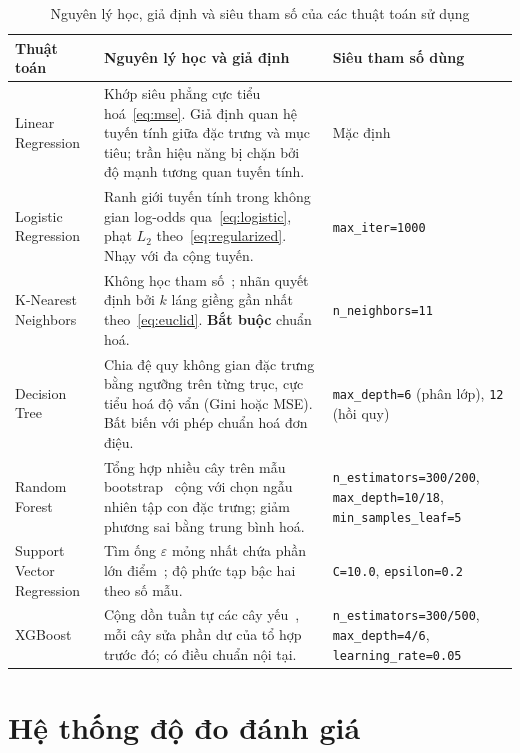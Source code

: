 \begin{table}[H]
\centering
\caption{Nguyên lý học, giả định và siêu tham số của các thuật toán sử dụng}
\label{tab:thuattoan}
\scriptsize
\begin{tabularx}{\textwidth}{@{}L{2.3cm}XL{2.95cm}@{}}
\toprule
\textbf{Thuật toán} & \textbf{Nguyên lý học và giả định} & \textbf{Siêu tham số dùng} \\
\midrule
Linear Regression &
Khớp siêu phẳng cực tiểu hoá~\eqref{eq:mse}. Giả định quan hệ tuyến tính giữa đặc trưng và mục tiêu; trần hiệu năng bị chặn bởi độ mạnh tương quan tuyến tính. &
Mặc định \\
\addlinespace
Logistic Regression &
Ranh giới tuyến tính trong không gian log-odds qua~\eqref{eq:logistic}, phạt $L_2$ theo~\eqref{eq:regularized}. Nhạy với đa cộng tuyến. &
\texttt{max\_iter=1000} \\
\addlinespace
K-Nearest Neighbors &
Không học tham số~\cite{cover1967}; nhãn quyết định bởi $k$ láng giềng gần nhất theo~\eqref{eq:euclid}. \textbf{Bắt buộc} chuẩn hoá. &
\texttt{n\_neighbors=11} \\
\addlinespace
Decision Tree &
Chia đệ quy không gian đặc trưng bằng ngưỡng trên từng trục, cực tiểu hoá độ vẩn (Gini hoặc MSE). Bất biến với phép chuẩn hoá đơn điệu. &
\texttt{max\_depth=6} (phân lớp), \texttt{12} (hồi quy) \\
\addlinespace
Random Forest &
Tổng hợp nhiều cây trên mẫu bootstrap~\cite{breiman2001} cộng với chọn ngẫu nhiên tập con đặc trưng; giảm phương sai bằng trung bình hoá. &
\texttt{n\_estimators=300/200}, \texttt{max\_depth=10/18}, \texttt{min\_samples\_leaf=5} \\
\addlinespace
Support Vector Regression &
Tìm ống $\varepsilon$ mỏng nhất chứa phần lớn điểm~\cite{cortes1995}; độ phức tạp bậc hai theo số mẫu. &
\texttt{C=10.0}, \texttt{epsilon=0.2} \\
\addlinespace
XGBoost &
Cộng dồn tuần tự các cây yếu~\cite{chen2016}, mỗi cây sửa phần dư của tổ hợp trước đó; có điều chuẩn nội tại. &
\texttt{n\_estimators=300/500}, \texttt{max\_depth=4/6}, \texttt{learning\_rate=0.05} \\
\bottomrule
\end{tabularx}
\end{table}

\section{Hệ thống độ đo đánh giá}
\label{sec:dodo}

